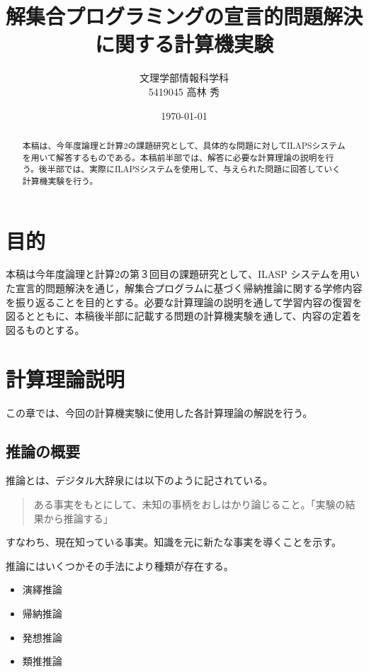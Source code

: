 \documentclass[dvipdfmx]{jsarticle}
\title{解集合プログラミングの宣言的問題解決に関する計算機実験}
\author{文理学部情報科学科\\5419045 高林 秀}
\date{\today}
\begin{document}
\maketitle

\begin{abstract}
本稿は、今年度論理と計算2の課題研究として、具体的な問題に対してILAPSシステムを用いて解答するものである。本稿前半部では、解答に必要な計算理論の説明を行う。後半部では、実際にILAPSシステムを使用して、与えられた問題に回答していく計算機実験を行う。
\end{abstract}

\tableofcontents

\section{目的}
本稿は今年度論理と計算2の第３回目の課題研究として、ILASP システムを用いた宣言的問題解決を通じ，解集合プログラムに基づく帰納推論に関する学修内容を振り返ることを目的とする。必要な計算理論の説明を通して学習内容の復習を図るとともに、本稿後半部に記載する問題の計算機実験を通して、内容の定着を図るものとする。\par

\section{計算理論説明}
この章では、今回の計算機実験に使用した各計算理論の解説を行う。
\subsection{推論の概要}
推論とは、デジタル大辞泉には以下のように記されている。
\begin{quote}
  ある事実をもとにして、未知の事柄をおしはかり論じること。「実験の結果から推論する」\par
\end{quote}
すなわち、現在知っている事実。知識を元に新たな事実を導くことを示す。\par
推論にはいくつかその手法により種類が存在する。
\begin{itemize}
  \item 演繹推論
  \item 帰納推論
  \item 発想推論
  \item 類推推論
\end{itemize}
\end{document}
